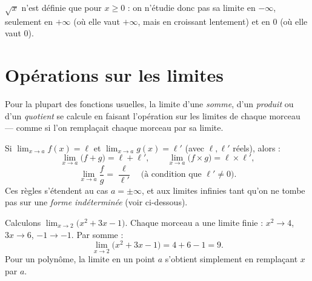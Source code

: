 \begin{remarque}
$\sqrt{x}$ n'est définie que pour $x\ge 0$ : on n'étudie donc pas sa limite en $-\infty$,
seulement en $+\infty$ (où elle vaut $+\infty$, mais en croissant lentement) et en $0$
(où elle vaut $0$).
\end{remarque}

\begin{illus}
\fig{Figure — sur $[0\,;\,+\infty[$, $x^2$ croît vite, $\sqrt{x}$ croît lentement ; toutes deux tendent vers $+\infty$.}
\end{illus}

\section{Opérations sur les limites}

\begin{aretenir}[Le principe]
Pour la plupart des fonctions usuelles, la limite d'une \emph{somme}, d'un
\emph{produit} ou d'un \emph{quotient} se calcule en faisant l'opération sur les
limites de chaque morceau — comme si l'on remplaçait chaque morceau par sa limite.
\end{aretenir}

\begin{propriete}
Si $\displaystyle\lim_{x\to a}f(x)=\ell$ et $\displaystyle\lim_{x\to a}g(x)=\ell'$
(avec $\ell,\ell'$ réels), alors :
\[ \lim_{x\to a}\big(f+g\big)=\ell+\ell',\qquad
   \lim_{x\to a}\big(f\times g\big)=\ell\times\ell', \]
\[ \lim_{x\to a}\frac{f}{g}=\frac{\ell}{\ell'}\quad\text{(à condition que }\ell'\neq 0). \]
Ces règles s'étendent au cas $a=\pm\infty$, et aux limites infinies tant qu'on ne
tombe pas sur une \emph{forme indéterminée} (voir ci-dessous).
\end{propriete}

\begin{exemple}
Calculons $\displaystyle\lim_{x\to 2}\big(x^2+3x-1\big)$. Chaque morceau a une limite
finie : $x^2\to 4$, $3x\to 6$, $-1\to -1$. Par somme :
\[ \lim_{x\to 2}\big(x^2+3x-1\big)=4+6-1=9. \]
Pour un polynôme, la limite en un point $a$ s'obtient simplement en remplaçant $x$ par $a$.
\end{exemple}

